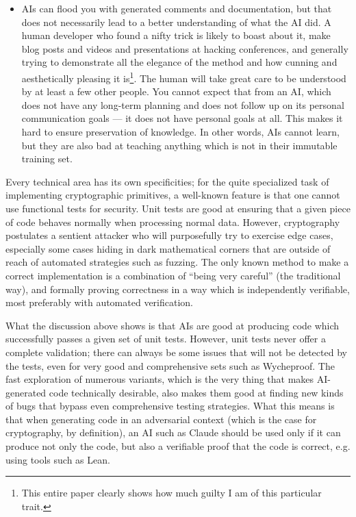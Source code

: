 \documentclass{llncs}
\begin{document}
\begin{itemize}
    \item AIs can flood you with generated comments and documentation,
    but that does not necessarily lead to a better understanding of what
    the AI did. A human developer who found a nifty trick is likely to
    boast about it, make blog posts and videos and presentations at
    hacking conferences, and generally trying to demonstrate all the
    elegance of the method and how cunning and aesthetically pleasing it
    is\footnote{This entire paper clearly shows how much guilty I am of
    this particular trait.}. The human will take great care to be
    understood by at least a few other people. You cannot expect that
    from an AI, which does not have any long-term planning and does not
    follow up on its personal communication goals --- it does not have
    personal goals at all. This makes it hard to ensure preservation of
    knowledge. In other words, AIs cannot learn, but they are also bad
    at teaching anything which is not in their immutable training set.

\end{itemize}

Every technical area has its own specificities; for the quite
specialized task of implementing cryptographic primitives, a well-known
feature is that one cannot use functional tests for security. Unit tests
are good at ensuring that a given piece of code behaves normally when
processing normal data. However, cryptography postulates a sentient
attacker who will purposefully try to exercise edge cases, especially
some cases hiding in dark mathematical corners that are outside of reach
of automated strategies such as fuzzing. The only known method to make a
correct implementation is a combination of ``being very careful'' (the
traditional way), and formally proving correctness in a way which is
independently verifiable, most preferably with automated verification.

What the discussion above shows is that AIs are good at producing code
which successfully passes a given set of unit tests. However, unit tests
never offer a complete validation; there can always be some issues that
will not be detected by the tests, even for very good and comprehensive
sets such as Wycheproof. The fast exploration of numerous variants,
which is the very thing that makes AI-generated code technically
desirable, also makes them good at finding new kinds of bugs that bypass
even comprehensive testing strategies. What this means is that when
generating code in an adversarial context (which is the case for
cryptography, by definition), an AI such as Claude should be used only
if it can produce not only the code, but also a verifiable proof that
the code is correct, e.g. using tools such as Lean\cite{Lean}.
\end{document}
